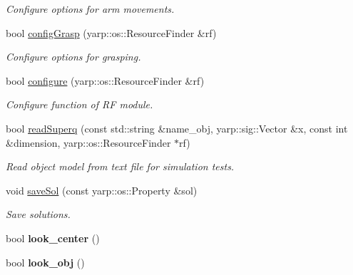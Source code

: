 \begin{DoxyCompactItemize}
\begin{DoxyCompactList}\small\item\em Configure options for arm movements. \end{DoxyCompactList}\item 
bool \hyperlink{classGraspingModule_a31c82e1ba3c80d1238e95449780f62c6}{config\+Grasp} (yarp\+::os\+::\+Resource\+Finder \&rf)
\begin{DoxyCompactList}\small\item\em Configure options for grasping. \end{DoxyCompactList}\item 
bool \hyperlink{classGraspingModule_ab4c0ea3cabb2cc6de63da53ba1771e27}{configure} (yarp\+::os\+::\+Resource\+Finder \&rf)\label{classGraspingModule_ab4c0ea3cabb2cc6de63da53ba1771e27}

\begin{DoxyCompactList}\small\item\em Configure function of RF module. \end{DoxyCompactList}\item 
bool \hyperlink{classGraspingModule_aa1c32186a8b7133db63e115898949b28}{read\+Superq} (const std\+::string \&name\+\_\+obj, yarp\+::sig\+::\+Vector \&x, const int \&dimension, yarp\+::os\+::\+Resource\+Finder $\ast$rf)
\begin{DoxyCompactList}\small\item\em Read object model from text file for simulation tests. \end{DoxyCompactList}\item 
void \hyperlink{classGraspingModule_a43a89c97919dd68a4ab28a6c9fe16a95}{save\+Sol} (const yarp\+::os\+::\+Property \&sol)
\begin{DoxyCompactList}\small\item\em Save solutions. \end{DoxyCompactList}\item 
bool {\bfseries look\+\_\+center} ()\label{classGraspingModule_af640219e03fdfe6e6145a5ff6f01d23a}

\item 
bool {\bfseries look\+\_\+obj} ()\label{classGraspingModule_a741cac4968db05d8dde9cd1856776c50}


\end{DoxyCompactItemize}

